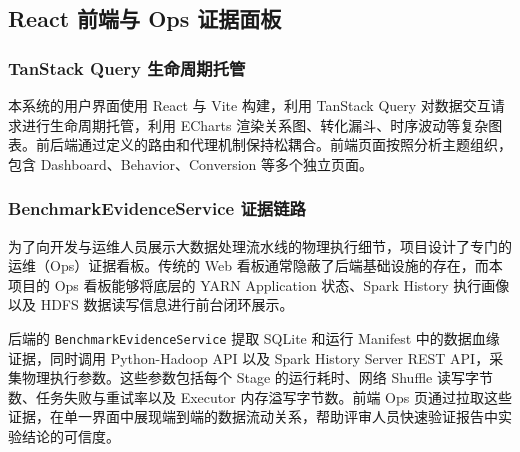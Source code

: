 \subsection{React 前端与 Ops 证据面板}

\subsubsection{TanStack Query 生命周期托管}

本系统的用户界面使用 React 与 Vite 构建，利用 TanStack Query 对数据交互请求进行生命周期托管，利用 ECharts 渲染关系图、转化漏斗、时序波动等复杂图表。前后端通过定义的路由和代理机制保持松耦合。前端页面按照分析主题组织，包含 Dashboard、Behavior、Conversion 等多个独立页面。

\subsubsection{BenchmarkEvidenceService 证据链路}

为了向开发与运维人员展示大数据处理流水线的物理执行细节，项目设计了专门的运维（Ops）证据看板。传统的 Web 看板通常隐蔽了后端基础设施的存在，而本项目的 Ops 看板能够将底层的 YARN Application 状态、Spark History 执行画像以及 HDFS 数据读写信息进行前台闭环展示。

后端的 \texttt{BenchmarkEvidenceService} 提取 SQLite 和运行 Manifest 中的数据血缘证据，同时调用 Python-Hadoop API 以及 Spark History Server REST API，采集物理执行参数。这些参数包括每个 Stage 的运行耗时、网络 Shuffle 读写字节数、任务失败与重试率以及 Executor 内存溢写字节数。前端 Ops 页通过拉取这些证据，在单一界面中展现端到端的数据流动关系，帮助评审人员快速验证报告中实验结论的可信度。
